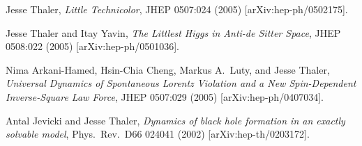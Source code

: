 \begin{list}{[]\addtocounter{jessecount}{-1}}{\leftmargin=3em \itemsep=4pt}
\item
 Jesse Thaler,
\emph{Little Technicolor},
JHEP 0507:024 (2005)
[arXiv:hep-ph/0502175].

\item
 Jesse Thaler and Itay Yavin,
\emph{The Littlest Higgs in Anti-de Sitter Space},
JHEP 0508:022 (2005)
[arXiv:hep-ph/0501036].

\item
 Nima Arkani-Hamed, Hsin-Chia Cheng, Markus A.\ Luty, and Jesse Thaler,
\emph{Universal Dynamics of Spontaneous Lorentz Violation and a New Spin-Dependent Inverse-Square Law Force},
JHEP 0507:029 (2005)
[arXiv:hep-ph/0407034].

\item
 Antal Jevicki and Jesse Thaler,
\emph{Dynamics of black hole formation in an exactly solvable model},
Phys.\ Rev.\ D66 024041 (2002)
[arXiv:hep-th/0203172].

\end{list}
